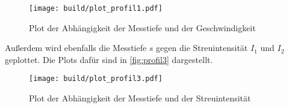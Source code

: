 \begin{figure}
    \centering
    \texttt{[image: build/plot\_profil1.pdf]}
    \caption{Plot der Abhängigkeit der Messtiefe und der Geschwindigkeit}
    \label{fig:profil1}
\end{figure}

Außerdem wird ebenfalls die Messtiefe $s$ gegen die Streuintensität $I_1$ und $I_2$ geplottet. Die Plots dafür sind in \autoref{fig:profil3} dargestellt.

\begin{figure}
    \centering
    \texttt{[image: build/plot\_profil3.pdf]}
    \caption{Plot der Abhängigkeit der Messtiefe und der Streuintensität}
    \label{fig:profil3}
\end{figure}